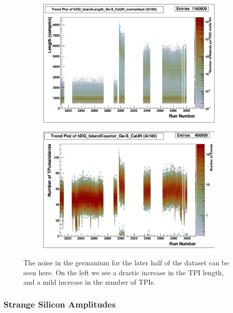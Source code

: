 \documentclass[a4paper]{article}
\begin{document}
\begin{figure}
  \begin{subfigure}{0.5\textwidth}
    \includegraphics[width=0.9\linewidth]{figs/al100/ges_length}
  \end{subfigure}%
  \begin{subfigure}{0.5\textwidth}
    \includegraphics[width=0.9\linewidth]{figs/al100/ges_n}
  \end{subfigure}
  \caption{The noise in the germanium for the later half
    of the dataset can be seen here. On the left we see a drastic
    increase in the TPI length, and a mild increase in the number
    of TPIs.}
  \label{fig:al100_ge_noise}
\end{figure}


\subsubsection{Strange Silicon Amplitudes}
\label{sec:al100_silicon_amps}
\end{document}
